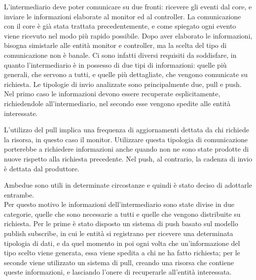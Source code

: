 L’intermediario deve poter comunicare su due fronti: ricevere gli eventi dal core, e inviare le informazioni elaborate al monitor ed al controller.
La comunicazione con il core è già stata trattata precedentemente, e come spiegato ogni evento viene ricevuto nel modo più rapido possibile.
Dopo aver elaborato le informazioni, bisogna simistarle alle entità monitor e controller, ma la scelta del tipo di comunicazione non è banale.
Ci sono infatti diversi requisiti da soddisfare, in quanto l’intermediario è in possesso di due tipi di informazioni: quelle più generali, che servono a tutti, e quelle più dettagliate, che vengono comunicate su richiesta.
Le tipologie di invio analizzate sono principalmente due, pull e push. Nel primo caso le informazioni devono essere recuperate esplicitamente, richiedendole all’intermediario, nel secondo esse vengono spedite alle entità interessate. %

L'utilizzo del pull implica una frequenza di aggiornamenti dettata da chi richiede la risorsa, in questo caso il monitor. Utilizzare questa tipologia di comunicazione porterebbe a richiedere informazioni anche quando non ne sono state prodotte di nuove rispetto alla richiesta precedente. Nel push, al contrario, la cadenza di invio è dettata dal produttore.

Ambedue sono utili in determinate circostanze e quindi è stato deciso di adottarle entrambe.\\
Per questo motivo le informazioni dell’intermediario sono state divise in due categorie, quelle che sono necessarie a tutti e quelle che vengono distribuite su richiesta. Per le prime è stato disposto un sistema di push basato sul modello publish subscribe, in cui le entità si registrano per ricevere una determinata tipologia di dati, e da quel momento in poi ogni volta che un'informazione del tipo scelto viene generata, essa viene spedita a chi ne ha fatto richiesta; per le seconde viene utilizzato un sistema di pull, creando una risorsa che contiene queste informazioni, e lasciando l’onere di recuperarle all’entità interessata.

